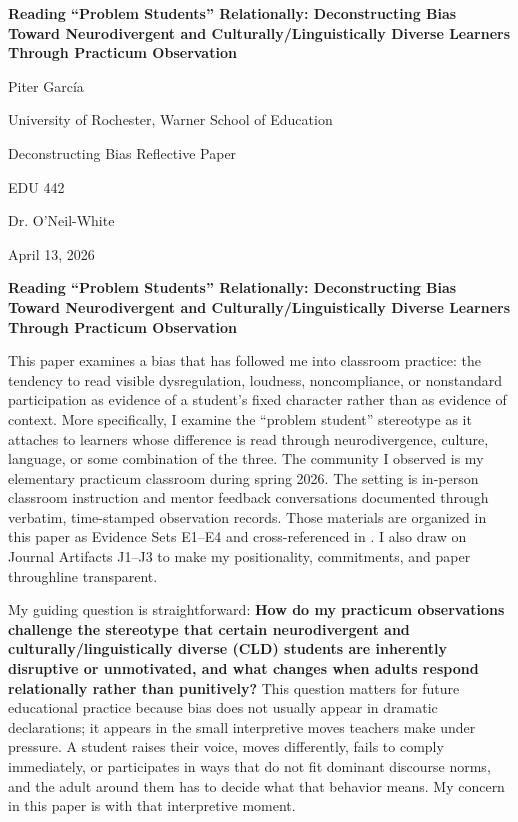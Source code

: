 \documentclass[12pt]{article}
\newcommand{\PaperTitle}{Reading ``Problem Students'' Relationally: Deconstructing Bias Toward Neurodivergent and Culturally/Linguistically Diverse Learners Through Practicum Observation}
\newcommand{\AuthorName}{Piter Garc\'ia}
\newcommand{\Affiliation}{University of Rochester, Warner School of Education}
\newcommand{\CourseName}{EDU 442}
\newcommand{\InstructorName}{Dr. O'Neil-White}
\newcommand{\DueDate}{April 13, 2026}
\newcommand{\AssignmentName}{Deconstructing Bias \textemdash{} Reflective Paper}
\newcommand{\levelone}[1]{\begin{center}\textbf{#1}\end{center}}
\newcommand{\EvidenceSet}[1]{\textsc{E#1}}
\newcommand{\JournalArtifact}[1]{\textsc{J#1}}
\begin{document}
\begin{titlepage}
\thispagestyle{fancy}
\begin{center}
\vspace*{0.14\textheight}
{\Large\bfseries \PaperTitle\par}

\vspace{0.06\textheight}
{\AuthorName\par}
{\Affiliation\par}

\vspace{1.25\baselineskip}
{\AssignmentName\par}

\vspace{1.25\baselineskip}
{\CourseName\par}
{\InstructorName\par}
{\DueDate\par}
\vfill
\end{center}
\end{titlepage}

\setcounter{page}{2}

\levelone{\PaperTitle}

This paper examines a bias that has followed me into classroom practice: the tendency to read visible dysregulation, loudness, noncompliance, or nonstandard participation as evidence of a student's fixed character rather than as evidence of context. More specifically, I examine the ``problem student'' stereotype as it attaches to learners whose difference is read through neurodivergence, culture, language, or some combination of the three. The community I observed is my elementary practicum classroom during spring 2026. The setting is in-person classroom instruction and mentor feedback conversations documented through verbatim, time-stamped observation records. Those materials are organized in this paper as Evidence Sets \EvidenceSet{1}--\EvidenceSet{4} and cross-referenced in . I also draw on Journal Artifacts \JournalArtifact{1}--\JournalArtifact{3} to make my positionality, commitments, and paper throughline transparent.

My guiding question is straightforward: \textbf{How do my practicum observations challenge the stereotype that certain neurodivergent and culturally/linguistically diverse (CLD) students are inherently disruptive or unmotivated, and what changes when adults respond relationally rather than punitively?} This question matters for future educational practice because bias does not usually appear in dramatic declarations; it appears in the small interpretive moves teachers make under pressure. A student raises their voice, moves differently, fails to comply immediately, or participates in ways that do not fit dominant discourse norms, and the adult around them has to decide what that behavior means. My concern in this paper is with that interpretive moment.
\end{document}
